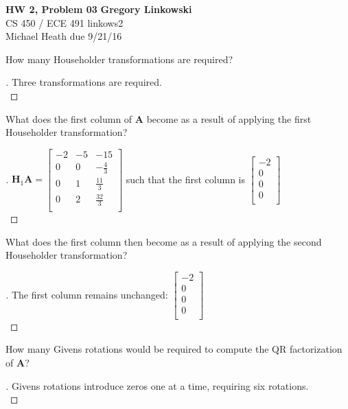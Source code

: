 \documentclass[12pt]{article}
\newenvironment{exercise}[2][Exercise]{\begin{trivlist}
\item[\hskip \labelsep {\bfseries #1}\hskip \labelsep {\bfseries #2.}]}{\end{trivlist}}
\begin{document}
\noindent
\large\textbf{HW 2, Problem 03} \hfill \textbf{Gregory Linkowski} \\
\normalsize CS 450 / ECE 491 \hfill linkows2 \\
Michael Heath \hfill due 9/21/16 \\



\begin{exercise}{1} 
	How many Householder transformations are required? \\ 
\end{exercise}

\begin{proof}[]
	Three transformations are required. \\
\end{proof}


\begin{exercise}{2} 
	What does the first column of $\bm{A}$ become as a result of applying the first Householder transformation? \\ 
\end{exercise}

\begin{proof}[]
	$\bm{H}_1 \bm{A} = 
	\begin{bmatrix}
		-2 & -5 & -15 \\
		0 & 0 & -\frac{4}{3} \\
		0 & 1 & \frac{11}{3} \\
		0 & 2 & \frac{32}{3} \\
	\end{bmatrix} $
	such that the first column is 
	$ \begin{bmatrix}
		-2 \\ 0 \\ 0 \\ 0 \\
	\end{bmatrix} $ \\
\end{proof}


\begin{exercise}{3} 
	What does the first column then become as a result of applying the second Householder transformation? \\ 
\end{exercise}

\begin{proof}[]
	The first column remains unchanged:  
	$ \begin{bmatrix}
	-2 \\ 0 \\ 0 \\ 0 \\
	\end{bmatrix} $ \\
\end{proof}


\begin{exercise}{4} 
	How many Givens rotations would be required to compute the QR factorization of $\bm{A}$? \\ 
\end{exercise}

\begin{proof}[]
	Givens rotations introduce zeros one at a time, requiring six rotations. \\
\end{proof}
\end{document}

